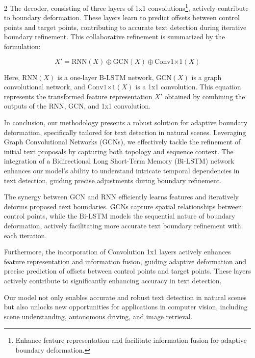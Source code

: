 \documentclass[sn-mathphys,Numbered]{sn-jnl}%
\begin{document}
\begin{multicols}{2}
The decoder, consisting of three layers of 1x1 convolutions\protect\footnote{Enhance feature representation and facilitate information fusion for adaptive boundary deformation.}, actively contribute to boundary deformation. These layers learn to predict offsets between control points and target points, contributing to accurate text detection during iterative boundary refinement. This collaborative refinement is summarized by the formulation:

\begin{equation}
	X' = \text{{RNN}}(X) \oplus \text{{GCN}}(X) \oplus \text{{Conv1×1}}(X)
\end{equation}

Here, $\text{{RNN}}(X)$ is a one-layer B-LSTM network, $\text{{GCN}}(X)$ is a graph convolutional network, and $\text{{Conv1×1}}(X)$ is a 1x1 convolution. This equation represents the transformed feature representation $X'$ obtained by combining the outputs of the RNN, GCN, and 1x1 convolution.

In conclusion, our methodology presents a robust solution for adaptive boundary deformation, specifically tailored for text detection in natural scenes. Leveraging Graph Convolutional Networks (GCNs), we effectively tackle the refinement of initial text proposals by capturing both topology and sequence context. The integration of a Bidirectional Long Short-Term Memory (Bi-LSTM) network enhances our model's ability to understand intricate temporal dependencies in text detection, guiding precise adjustments during boundary refinement.

The synergy between GCN and RNN efficiently learns features and iteratively deforms proposed text boundaries. GCNs capture spatial relationships between control points, while the Bi-LSTM models the sequential nature of boundary deformation, actively facilitating more accurate text boundary refinement with each iteration.

Furthermore, the incorporation of Convolution 1x1 layers actively enhances feature representation and information fusion, guiding adaptive deformation and precise prediction of offsets between control points and target points. These layers actively contribute to significantly enhancing accuracy in text detection.

Our model not only enables accurate and robust text detection in natural scenes but also unlocks new opportunities for applications in computer vision, including scene understanding, autonomous driving, and image retrieval.


\end{multicols}
\end{document}

